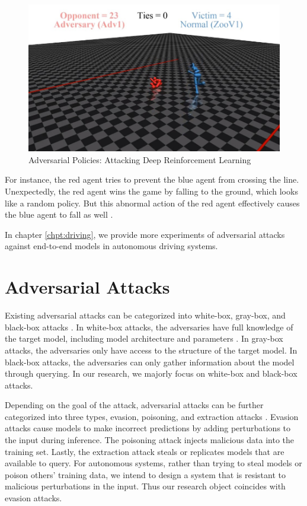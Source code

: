 \begin{figure}[H]
\centering
\includegraphics[scale=0.4]{figures/chapter_intro/adv_policy.jpg}
\caption{Adversarial Policies: Attacking Deep Reinforcement Learning}
\label{fig.adv_policy}
\end{figure}

For instance, the red agent tries to prevent the blue agent from crossing the line. Unexpectedly, the red agent wins the game by falling to the ground, which looks like a random policy. But this abnormal action of the red agent effectively causes the blue agent to fall as well \citep{gleave2021adversarial}. 

In chapter \ref{chpt:driving}, we provide more experiments of adversarial attacks against end-to-end models in autonomous driving systems.

\section{Adversarial Attacks}
\label{sec:adv_attack}

Existing adversarial attacks can be categorized into white-box, gray-box, and black-box attacks \citep{REN2020346}. In white-box attacks, the adversaries have full knowledge of the target model, including model architecture and parameters \citep{goodfellow2015explaining}. In gray-box attacks, the adversaries only have access to the structure of the target model. In black-box attacks, the adversaries can only gather information about the model through querying. In our research, we majorly focus on white-box and black-box attacks.

Depending on the goal of the attack, adversarial attacks can be further categorized into three types, evasion, poisoning, and extraction attacks \citep{art2018}. Evasion attacks cause models to make incorrect predictions by adding perturbations to the input during inference. The poisoning attack injects malicious data into the training set. Lastly, the extraction attack steals or replicates models that are available to query. For autonomous systems, rather than trying to steal models or poison others' training data, we intend to design a system that is resistant to malicious perturbations in the input. Thus our research object coincides with evasion attacks.

